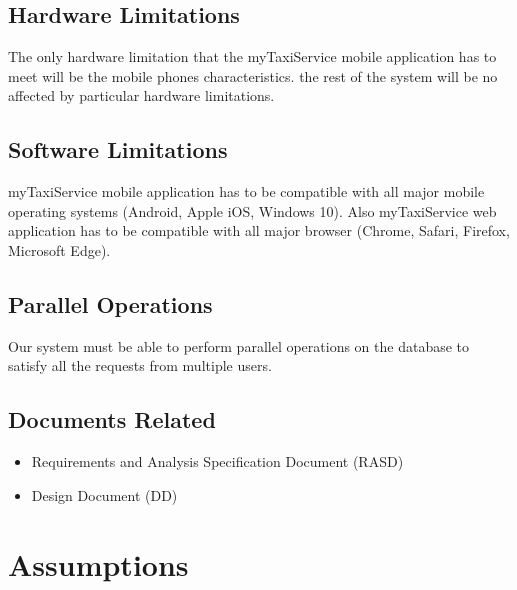 \documentclass{report}
\begin{document}
		\subsection{Hardware Limitations}
		The only hardware limitation that the myTaxiService mobile application has to meet will be the mobile phones characteristics. the rest of the system will be no affected by particular hardware limitations.

		\subsection{Software Limitations}
		myTaxiService mobile application has to be compatible with all major mobile operating systems (Android, Apple iOS, Windows 10).
		Also myTaxiService web application has to be compatible with all major browser (Chrome, Safari, Firefox, Microsoft Edge).

		\subsection{Parallel Operations}
		Our system must be able to perform parallel operations on the database to satisfy all the requests from multiple users.

		\subsection{Documents Related}

			\begin{itemize}
				\item Requirements and Analysis Specification Document (RASD)

				\item Design Document (DD)
			\end{itemize}

	\section{Assumptions}
\end{document}
